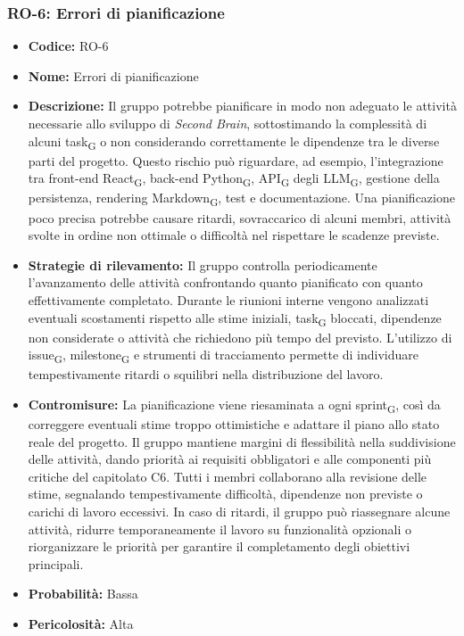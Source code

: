 \documentclass[a4paper, 10pt, colorlinks=true, linkcolor=black, urlcolor=blue, citecolor=blue, hidelinks]{article}
\begin{document}
\subsubsection{RO-6: Errori di pianificazione}

\begin{itemize}
    \item \textbf{Codice:} RO-6

    \item \textbf{Nome:} Errori di pianificazione

    \item \textbf{Descrizione:} Il gruppo potrebbe pianificare in modo non adeguato le attività necessarie allo sviluppo di \textit{Second Brain}, sottostimando la complessità di alcuni task\textsubscript{G} o non considerando correttamente le dipendenze tra le diverse parti del progetto. Questo rischio può riguardare, ad esempio, l'integrazione tra front-end React\textsubscript{G}, back-end Python\textsubscript{G}, API\textsubscript{G} degli LLM\textsubscript{G}, gestione della persistenza, rendering Markdown\textsubscript{G}, test e documentazione. Una pianificazione poco precisa potrebbe causare ritardi, sovraccarico di alcuni membri, attività svolte in ordine non ottimale o difficoltà nel rispettare le scadenze previste.

    \item \textbf{Strategie di rilevamento:} Il gruppo controlla periodicamente l'avanzamento delle attività confrontando quanto pianificato con quanto effettivamente completato. Durante le riunioni interne vengono analizzati eventuali scostamenti rispetto alle stime iniziali, task\textsubscript{G} bloccati, dipendenze non considerate o attività che richiedono più tempo del previsto. L'utilizzo di issue\textsubscript{G}, milestone\textsubscript{G} e strumenti di tracciamento permette di individuare tempestivamente ritardi o squilibri nella distribuzione del lavoro.

    \item \textbf{Contromisure:} La pianificazione viene riesaminata a ogni sprint\textsubscript{G}, così da correggere eventuali stime troppo ottimistiche e adattare il piano allo stato reale del progetto. Il gruppo mantiene margini di flessibilità nella suddivisione delle attività, dando priorità ai requisiti obbligatori e alle componenti più critiche del capitolato C6. Tutti i membri collaborano alla revisione delle stime, segnalando tempestivamente difficoltà, dipendenze non previste o carichi di lavoro eccessivi. In caso di ritardi, il gruppo può riassegnare alcune attività, ridurre temporaneamente il lavoro su funzionalità opzionali o riorganizzare le priorità per garantire il completamento degli obiettivi principali.

    \item \textbf{Probabilità:} Bassa

    \item \textbf{Pericolosità:} Alta
\end{itemize}
\end{document}

